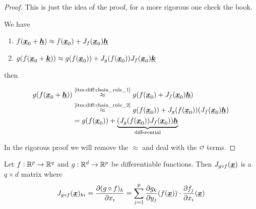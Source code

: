 \documentclass[12pt]{extarticle}
\renewcommand{\vec}[1]{\uvec{#1}}
\begin{document}
\begin{proof}
    This is just the idea of the proof, for a more rigorous one check the book.

    We have
    \begin{enumerate}[label=(\roman*.)]
        \item \label{itm:diff:chain_rule_1} $f(\vec{x}_0 + \vec{h}) \approx f(\vec{x}_0) + J_f(\vec{x}_0) \vec{h}$
        \item \label{itm:diff:chain_rule_2} $g(f(\vec{x}_0 + \vec{k})) \approx g(f(\vec{x}_0)) + J_g(f(\vec{x}_0)) J_f(\vec{x}_0) \vec{k}$
    \end{enumerate}

    then

    \begin{align}
        g(f(\vec{x}_0 + \vec{h})) & \stackrel{\text{\ref{itm:diff:chain_rule_1}}}{\approx} g(f(\vec{x}_0) + J_f(\vec{x}_0) \vec{h})                     \\
                                  & \stackrel{\text{\ref{itm:diff:chain_rule_2}}}{\approx} g(f(\vec{x}_0)) + J_g(f(\vec{x}_0)) (J_f(\vec{x}_0) \vec{h}) \\
                                  & = g(f(\vec{x}_0)) + \underbrace{(J_g(f(\vec{x}_0)) J_f(\vec{x}_0)) \vec{h}}_{\text{differential}}
    \end{align}

    In the rigorous proof we will remove the $\approx$ and deal with the $\o$ terms.
\end{proof}

\begin{example}
    Let $f: \mathbb{R}^p \to \mathbb{R}^q$ and $g: \mathbb{R}^d \to \mathbb{R}^p$ be differentiable functions.
    Then $J_{g \circ f}(\vec{x})$ is a $q \times d$ matrix where
    \begin{equation}
        J_{g \circ f}(\vec{x})_{ki} =
        \pdv{(g \circ f)_k}{x_i}\/ = \sum_{j=1}^p \pdv{g_k}{y_j}\/(f(\vec{x})) \cdot \pdv{f_j}{x_i}\/(\vec{x})
    \end{equation}
\end{example}
\end{document}
